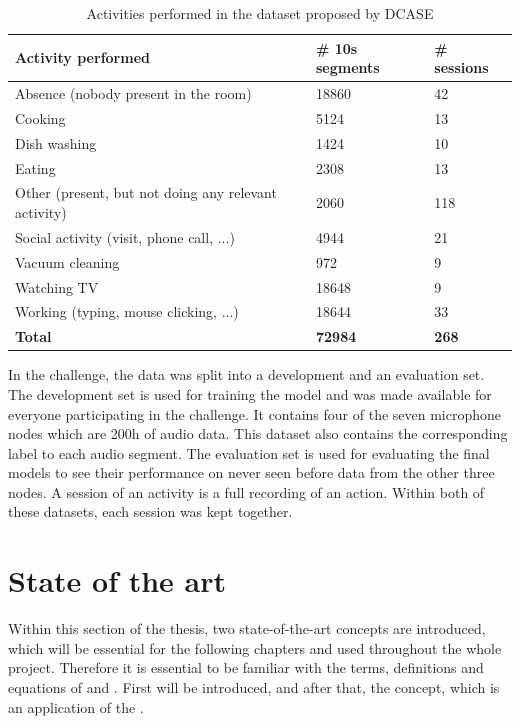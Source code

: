 \begin{table}[htbp]
    \centering
    \caption[Activities performed in the dataset proposed by DCASE]{Activities performed in the dataset proposed by DCASE \footnotemark}
	\label{tab:DCASE-activiies-performed}
    \begin{tabular}{l|l|l}
        \toprule
        \textbf{Activity performed} & \textbf{\# 10s segments} & \textbf{\# sessions} \\ 
        \midrule[1pt]
        Absence (nobody present in the room) & 18860 & 42 \\
        \hline
        Cooking & 5124 & 13 \\ 
        \hline
        Dish washing & 1424 & 10 \\ 
        \hline
        Eating & 2308 & 13 \\ 
        \hline
        Other (present, but not doing any relevant activity) & 2060 & 118 \\ 
        \hline
        Social activity (visit, phone call, ...) & 4944 & 21 \\ 
        \hline
        Vacuum cleaning & 972 & 9 \\ 
        \hline
        Watching TV & 18648 & 9 \\ 
        \hline
        Working (typing, mouse clicking, ...) & 18644 & 33 \\ 
        \midrule[1pt]
        \textbf{Total} & \textbf{72984} & \textbf{268} \\
        \bottomrule
    \end{tabular}
\end{table}
\noindent
In the challenge, the data was split into a development and an evaluation set. The development set is used for training the model and was made available for everyone participating in the challenge. It contains four of the seven microphone nodes which are 200h of audio data. This dataset also contains the corresponding label to each audio segment. The evaluation set is used for evaluating the final models to see their performance on never seen before data from the other three nodes. A session of an activity is a full recording of an action. Within both of these datasets, each session was kept together.

\section{State of the art}
\label{sec:State-of-art}
Within this section of the thesis, two state-of-the-art concepts are introduced, which will be essential for the following chapters and used throughout the whole project. Therefore it is essential to be familiar with the terms, definitions and equations of  and . First  will be introduced, and after that, the  concept, which is an application of the .

